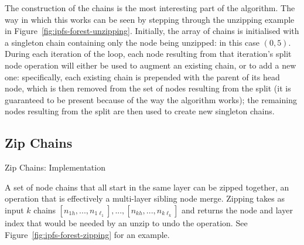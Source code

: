 \documentclass[10pt,twocolumn,twoside]{IEEEtran}
\begin{document}
The construction of the chains is the most interesting part of the algorithm. The way in which this works can be seen by stepping through the unzipping example in Figure~\ref{fig:ipfs-forest-unzipping}. Initially, the array of chains is initialised with a singleton chain containing only the node being unzipped: in this case $(0,5)$\footnotemark. During each iteration of the loop, each node resulting from that iteration's split node operation will either be used to augment an existing chain, or to add a new one: specifically, each existing chain is prepended with the parent of its head node, which is then removed from the set of nodes resulting from the split (it is guaranteed to be present because of the way the algorithm works); the remaining nodes resulting from the split are then used to create new singleton chains.


\subsection{Zip Chains}

\begin{stulisting}[t]
\caption{Zip Chains: Implementation}
\label{code:ipfs-forest-zipchains}

\end{stulisting}

A set of node chains that all start in the same layer can be zipped together, an operation that is effectively a multi-layer sibling node merge. Zipping takes as input $k$ chains $[n_{1h},...,n_{1\ell_1}],...,[n_{kh},...,n_{k\ell_k}]$ and returns the node and layer index that would be needed by an unzip to undo the operation. See Figure~\ref{fig:ipfs-forest-zipping} for an example.
\end{document}
